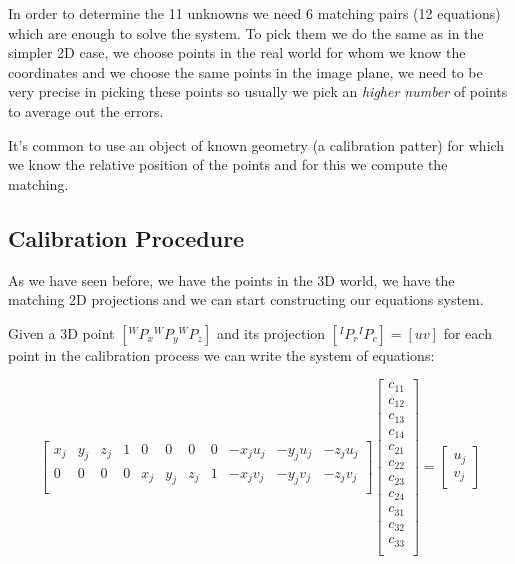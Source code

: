 In order to determine the 11 unknowns we need 6 matching pairs (12 equations) which are enough to solve the system. To pick them we do the same as in the simpler 2D case, we choose points in the real world for whom we know the coordinates and we choose the same points in the image plane, we need to be very precise in picking these points so usually we pick an \textit{higher number} of points to average out the errors.

It's common to use an object of known geometry (a calibration patter) for which we know the relative position of the points and for this we compute the matching.


\subsection{Calibration Procedure}

As we have seen before, we have the points in the 3D world, we have the matching 2D projections and we can start constructing our equations system.


Given a 3D point \([{}^WP_x {}^WP_y {}^WP_z]\) and its projection \([{}^IP_r {}^IP_c] = [u v]\) for each point in the calibration process we can write the system of equations:
\setcounter{MaxMatrixCols}{20}

\[
    \begin{bmatrix}
        x_j & y_j & z_j & 1 & 0 & 0 & 0 & 0 & -x_ju_j & -y_ju_j & -z_ju_j \\
        0 & 0 & 0 & 0 & x_j & y_j & z_j & 1 & -x_jv_j & -y_jv_j & -z_jv_j \\
    \end{bmatrix}
    \begin{bmatrix}
        c_{11} \\
        c_{12} \\
        c_{13} \\
        c_{14} \\
        c_{21} \\
        c_{22} \\
        c_{23} \\
        c_{24} \\
        c_{31} \\
        c_{32} \\
        c_{33} \\
    \end{bmatrix}
    =
    \begin{bmatrix}
        u_j \\
        v_j
    \end{bmatrix}
\]

